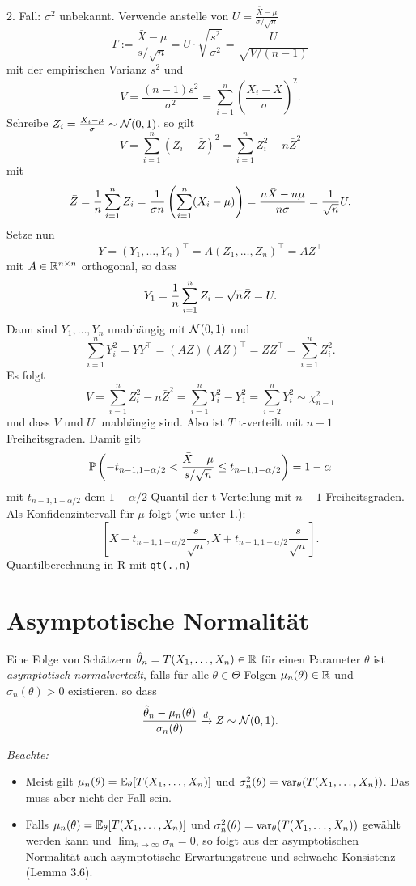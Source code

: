 \begin{exmp}
  2. Fall: $\sigma^2$ unbekannt. Verwende anstelle von $U = \frac{\bar{X} -
    \mu}{\sigma / \sqrt{n}}$
  \[ T := \frac{\bar{X} - \mu}{s/\sqrt{n}} = U \cdot \sqrt{
      \frac{s^2}{\sigma^2}} = \frac{U}{\sqrt{V / (n-1)}}\]
  mit der empirischen Varianz $s^2$ und
  \[ V = \frac{(n-1)s^2}{\sigma^2} = \sum_{i=1}^n
    \left( \frac{X_i - \bar{X}}{\sigma} \right)^2. \]
  Schreibe $Z_i = \frac{X_i - \mu}{\sigma} \sim \mathcal{N}(0,1)$, so gilt
  \[ V = \sum_{i=1}^n (Z_i - \bar{Z})^2 = \sum_{i=1}^n Z_i^2 - n \bar{Z}^2 \]
  mit
  \[ \bar{Z} = \frac{1}{n} \sum_{i=1}^n Z_i = \frac{1}{\sigma n}
    \left( \sum_{i=1}^n (X_i - \mu) \right)
    = \frac{n \bar{X} - n \mu}{n \sigma} = \frac{1}{\sqrt{n}} U. \]
  Setze nun
  \[ Y = (Y_1, \ldots, Y_n)^\top = A(Z_1, \ldots, Z_n)^\top = A Z^\top \]
  mit $A \in \mathbb{R}^{n \times n}$ orthogonal, so dass
  \[ Y_1 = \frac{1}{n} \sum_{i=1}^n Z_i = \sqrt{n} \bar{Z} = U. \]
  Dann sind $Y_1, \ldots, Y_n$ unabhängig mit $\mathcal{N}(0,1)$ und
  \[ \sum_{i=1}^n Y_i^2 = Y Y^\top = (AZ)(AZ)^\top = ZZ^\top = \sum_{i=1}^n
    Z_i^2. \]
  Es folgt
  \[ V = \sum_{i=1}^n Z_i^2 - n \bar{Z}^2 = \sum_{i=1}^n Y_i^2 - Y_1^2 =
    \sum_{i=2}^n Y_i^2 \sim \chi_{n-1}^2 \]
  und dass $V$ und $U$ unabhängig sind. Also ist $T$ t-verteilt mit $n-1$
  Freiheitsgraden. Damit gilt
  \[ \mathbb{P} \left( -t_{n-1,1-\alpha/2} <
      \frac{\bar{X}-\mu}{s/\sqrt{n}} \le
      t_{n-1,1-\alpha/2} \right)
    = 1 - \alpha \]
  mit $t_{n-1,1-\alpha/2}$ dem $1-\alpha/2$-Quantil der t-Verteilung mit $n-1$
  Freiheitsgraden. Als Konfidenzintervall für $\mu$ folgt (wie unter 1.):
  \[ \left[ \bar{X} - t_{n-1,1-\alpha/2} \frac{s}{\sqrt{n}},
      \bar{X} + t_{n-1,1-\alpha/2} \frac{s}{\sqrt{n}} \right]. \]
  Quantilberechnung in R mit \verb+qt(.,n)+
\end{exmp}

\section{Asymptotische Normalität}
\begin{defn}
  Eine Folge von Schätzern $\hat{\theta}_n = T(X_1, \ldots, X_n) \in \mathbb{R}$ für
  einen Parameter $\theta$ ist \emph{asymptotisch normalverteilt}, falls für
  alle $\theta \in \Theta$ Folgen $\mu_n(\theta) \in \mathbb{R}$ und
  $\sigma_n(\theta) > 0$ existieren, so dass
  \[ \frac{\hat{\theta}_n - \mu_n(\theta)}{\sigma_n(\theta)} \xrightarrow{d} Z
    \sim \mathcal{N}(0,1). \]
\end{defn}

\emph{Beachte:}
\begin{itemize}
  \item Meist gilt $\mu_n(\theta) = \mathbb{E}_\theta[T(X_1, \ldots, X_n)]$ und
    $\sigma_n^2(\theta) = \operatorname{var}_\theta(T(X_1, \ldots, X_n))$. Das muss aber nicht
    der Fall sein.
  \item Falls $\mu_n(\theta) = \mathbb{E}_\theta[T(X_1, \ldots, X_n)]$ und
    $\sigma_n^2(\theta) = \operatorname{var}_\theta(T(X_1, \ldots, X_n))$ gewählt werden kann
    und $\lim_{n \to \infty} \sigma_n = 0$, so folgt aus der asymptotischen
    Normalität auch asymptotische Erwartungstreue und schwache Konsistenz (Lemma
    3.6).
\end{itemize}

